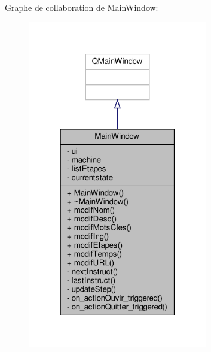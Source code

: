 Graphe de collaboration de Main\+Window\+:\nopagebreak
\begin{figure}[H]
\begin{center}
\leavevmode
\includegraphics[width=223pt]{classMainWindow__coll__graph}
\end{center}
\end{figure}
